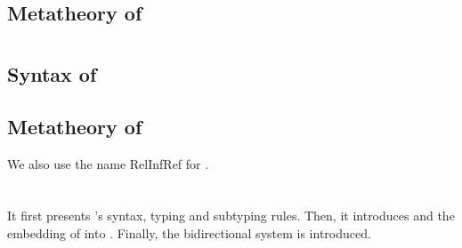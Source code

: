   \subsection{Metatheory of \relinf}
   \label{appendixb:relinf_lemma}
   
   \clearpage
   
\section{\relinfref}
 \subsection{Syntax of \relinfref}
  \label{appendixb:relinfref_syntax}
 
 \clearpage
 \subsection{Metatheory of \relinfref}
  \label{appendixb:relinfref_lemma}
  We also use the name RelInfRef for {\relinfref}.
    
  \clearpage
  
\section{\Relcost}


It first presents {\Relcost}'s syntax, typing and subtyping rules. Then,
it introduces {\relcostmin} and the embedding of {\Relcost} into
{\relcostmin}. Finally, the bidirectional system {\birelcost} is
introduced. 

